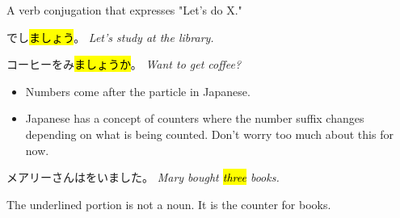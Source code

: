     {
    A verb conjugation that expresses "Let's do X."

   でし\hl{ましょう}。 
   \textit{Let's study at the library.}

    コーヒーをみ\hl{ましょうか}。
    \textit{Want to get coffee?}
    }

    {
    \begin{itemize}
        \item Numbers come after the particle in Japanese.
        \item Japanese has a concept of counters where the number suffix changes depending on what is being counted. Don't worry too much about this for now. 
    \end{itemize}

    メアリーさんはをいました。
    \textit{Mary bought \hl{three} books.}

    The underlined portion is not a noun. It is the counter for books.
    }